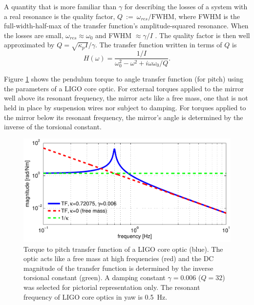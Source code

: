 A quantity that is more familiar than $\gamma$ for describing the losses of a system with a real resonance is the quality factor, $Q~:=~\omega_{res}/\mathrm{FWHM}$, where FWHM is the full-width-half-max of the transfer function's amplitude-squared resonance. When the losses are small, $\omega_{res} \approx \omega_0$ and FWHM $\approx \gamma/I$ \cite[23-4]{Feynman1970Feynman}. The quality factor is then well approximated by $Q = \sqrt{\kappa_p I}/\gamma$. The transfer function written in terms of $Q$ is \begin{equation} H(\omega) = \frac{1/I}{\omega_0^2 - \omega^2 + i \omega \omega_0 / Q}.  \label{eq:TFpendulum} \end{equation}

Figure \ref{fig:pendTF} shows the pendulum torque to angle transfer
function (for pitch) using the parameters of a LIGO core optic. For
external torques applied to the mirror well above its resonant frequency,
the mirror acts like a free mass, one that is not held in place by
suspension wires nor subject to damping. For torques applied to the
mirror below its resonant frequency, the mirror's angle is determined
by the inverse of the torsional constant.

\begin{figure}
\begin{centering}
\includegraphics[width=1.0\textwidth]{figures/pendTF.pdf}
\caption[Torque to pitch transfer function of a LIGO core
optic]{Torque to pitch transfer function of a LIGO core optic
  (blue). The optic acts like a free mass at high frequencies (red)
  and the DC magnitude of the transfer function is determined by the
  inverse torsional constant (green). A damping constant $\gamma =
  0.006$ ($Q=32$) was selected for pictorial representation only. The
  resonant frequency of LIGO core optics in yaw is 0.5~Hz.}
\label{fig:pendTF}
\end{centering}
\end{figure}





